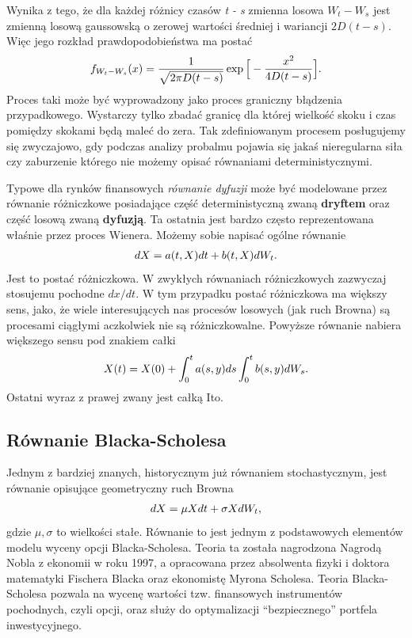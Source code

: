 \documentclass[a4paper,12pt,polish]{sphinxmanual}
\begin{document}
Wynika z tego, że dla każdej różnicy czasów \emph{t - s} zmienna losowa $W_t - W_s$ jest zmienną losową
gaussowską o zerowej wartości średniej i wariancji $2D(t-s)$. Więc jego rozkład prawdopodobieństwa ma
postać
\begin{gather}
\begin{split}f_{W_t - W_s}(x) = \frac{1}{\sqrt{2 \pi D (t - s)}} \exp \Big[ -\frac{x^2}{4D(t-s)} \Big].\end{split}\notag
\end{gather}
Proces taki może być wyprowadzony jako proces graniczny błądzenia przypadkowego. Wystarczy tylko zbadać
granicę dla której wielkość skoku i czas pomiędzy skokami będą maleć do zera. Tak zdefiniowanym procesem
posługujemy się zwyczajowo, gdy podczas analizy probalmu pojawia się jakaś nieregularna siła czy zaburzenie
którego nie możemy opisać równaniami deterministycznymi.

Typowe dla rynków finansowych \emph{równanie dyfuzji} może być modelowane przez równanie różniczkowe posiadające
część deterministyczną zwaną \textbf{dryftem} oraz część losową zwaną \textbf{dyfuzją}. Ta ostatnia jest bardzo często
reprezentowana właśnie przez proces Wienera. Możemy sobie napisać ogólne równanie
\begin{gather}
\begin{split}dX = a(t, X) dt + b(t,X) dW_t.\end{split}\notag
\end{gather}
Jest to postać różniczkowa. W zwykłych równaniach różniczkowych zazwyczaj stosujemu pochodne $dx/dt$. W
tym przypadku postać różniczkowa ma większy sens, jako, że wiele interesujących nas procesów losowych (jak
ruch Browna) są procesami ciągłymi aczkolwiek nie są różniczkowalne. Powyższe równanie nabiera większego
sensu pod znakiem całki
\begin{gather}
\begin{split}X(t) = X(0) + \int_0^t a(s,y) ds \int_0^t b(s,y) dW_s.\end{split}\notag
\end{gather}
Ostatni wyraz z prawej zwany jest całką Ito.


\subsection{Równanie Blacka-Scholesa}
\label{ch5/chV013:rownanie-blacka-scholesa}
Jednym z bardziej znanych, historycznym już równaniem stochastycznym, jest równanie opisujące geometryczny
ruch Browna
\begin{gather}
\begin{split}dX = \mu X dt + \sigma X dW_t,\end{split}\notag
\end{gather}
gdzie $\mu, \sigma$ to wielkości stałe.
Równanie to jest jednym z podstawowych elementów modelu wyceny opcji Blacka-Scholesa. Teoria ta została
nagrodzona Nagrodą Nobla z ekonomii w roku 1997, a opracowana przez absolwenta fizyki i doktora matematyki
Fischera Blacka oraz ekonomistę Myrona Scholesa. Teoria Blacka-Scholesa pozwala na wycenę wartości tzw.
finansowych instrumentów pochodnych, czyli opcji, oraz służy do optymalizacji ``bezpiecznego'' portfela
inwestycyjnego.
\end{document}
